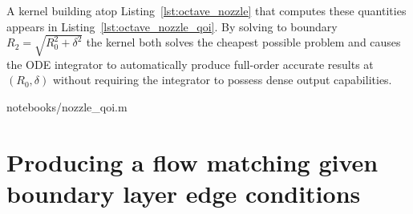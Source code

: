 \documentclass[letterpaper,11pt,nointlimits,reqno]{amsart}
\begin{document}
A kernel building atop Listing~\ref{lst:octave_nozzle} that computes these
quantities appears in Listing~\ref{lst:octave_nozzle_qoi}. By solving to
boundary $R_2 = \sqrt{R_0^2 + \delta^2}$ the kernel both solves the cheapest
possible problem and causes the ODE integrator to automatically produce
full-order accurate results at $\left(R_0,\delta\right)$ without requiring the
integrator to possess dense output capabilities.


                {notebooks/nozzle_qoi.m}

\section{Producing a flow matching given boundary layer edge conditions}
\end{document}
